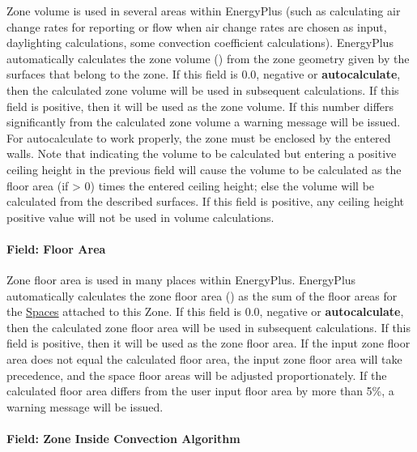 Zone volume is used in several areas within EnergyPlus (such as calculating air change rates for reporting or flow when air change rates are chosen as input, daylighting calculations, some convection coefficient calculations). EnergyPlus automatically calculates the zone volume (\SI{}{\volume}) from the zone geometry given by the surfaces that belong to the zone. If this field is 0.0, negative or \textbf{autocalculate}, then the calculated zone volume will be used in subsequent calculations. If this field is positive, then it will be used as the zone volume. If this number differs significantly from the calculated zone volume a warning message will be issued. For autocalculate to work properly, the zone must be enclosed by the entered walls. Note that indicating the volume to be calculated but entering a positive ceiling height in the previous field will cause the volume to be calculated as the floor area (if \textgreater{} 0) times the entered ceiling height; else the volume will be calculated from the described surfaces. If this field is positive, any ceiling height positive value will not be used in volume calculations.

\paragraph{Field: Floor Area}\label{field-floor-area}

Zone floor area is used in many places within EnergyPlus. EnergyPlus automatically calculates the zone floor area (\SI{}{\area}) as the sum of the floor areas for the \hyperref[space]{Spaces} attached to this Zone. If this field is 0.0, negative or \textbf{autocalculate}, then the calculated zone floor area will be used in subsequent calculations. If this field is positive, then it will be used as the zone floor area. If the input zone floor area does not equal the calculated floor area, the input zone floor area will take precedence, and the space floor areas will be adjusted proportionately. If the calculated floor area differs from the user input floor area by more than 5\%, a warning message will be issued.

\paragraph{Field: Zone Inside Convection Algorithm}\label{field-zone-inside-convection-algorithm}

